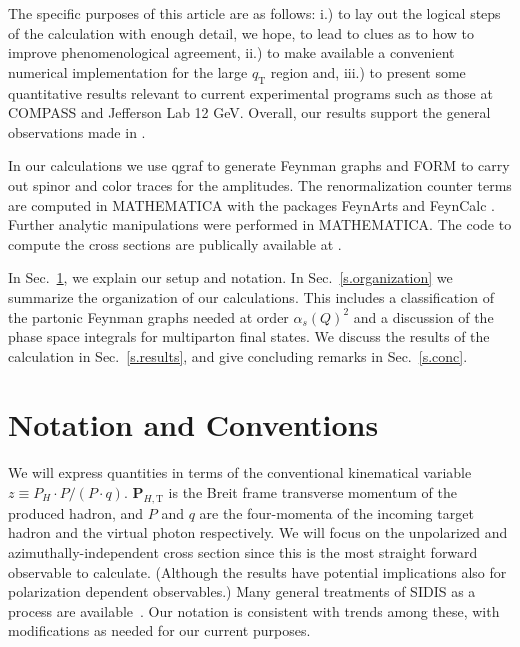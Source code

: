 \documentclass[prd,preprintnumbers,nofootinbib,superscriptaddress,onecolumn,preprint]{revtex4-1}
\newcommand{\T}[2]{\boldsymbol{#1}_{#2\text{T}}}
\newcommand\3[1]{\boldsymbol{#1}}
\newcommand{\Tsc}[2]{#1_{#2\text{T}}}
\newcommand{\sref}[1]{Sec.~\ref{s.#1}}
\begin{document}
The specific purposes of this article are as follows:  i.) to lay out
the logical steps of the calculation with enough detail, we hope, to
lead to clues as to how to improve phenomenological agreement,
ii.) to make available a convenient numerical implementation for the large $\Tsc{q}{}$ 
region and, 
iii.) to present some
quantitative results relevant to current
experimental programs such as those at COMPASS and Jefferson Lab 12 GeV.
Overall, our results support the general observations made in
\cite{Gonzalez-Hernandez:2018ipj}.

In our calculations we use qgraf \cite{Nogueira:1991ex}
to generate Feynman graphs and FORM \cite{Kuipers:2012rf}
to carry out spinor and color traces for the amplitudes. The renormalization
counter terms are computed in MATHEMATICA with the packages 
FeynArts \cite{Kublbeck:1990xc,Hahn:2000kx} and FeynCalc \cite{Mertig:1990an,Shtabovenko:2016sxi}.
Further analytic manipulations were performed in MATHEMATICA. 
The code to compute the cross sections are publically
available at \cite{BigTMD}.

In \sref{overview}, we explain our setup and notation. In \sref{organization} we 
summarize the organization of our calculations. This includes a classification of
the partonic Feynman graphs needed at order $\alpha_s(Q)^2$ and a discussion of the 
phase space integrals for multiparton final states. We discuss the results of the 
calculation in \sref{results}, and give concluding remarks in \sref{conc}.


\section{Notation and Conventions}
\label{s.overview}

We will express quantities in terms of the conventional kinematical
variable $z \equiv P_H \cdot P/ (P \cdot q)$. $\T{P}{H,}$ is the Breit
frame transverse momentum of the produced hadron, and $P$ and $q$ are
the four-momenta of the incoming target hadron and the virtual photon
respectively.  We will focus on the unpolarized and
azimuthally-independent cross section since this is the most straight
forward observable to calculate.  (Although the results have potential
implications also for polarization dependent observables.) Many 
general treatments of SIDIS as a process are available~\cite{Meng:1991da,Levelt:1993ac,Meng:1995yn,Mulders:1996dh,Nadolsky:1999kb,Nadolsky:2000ky,Barone:2001sp,Ji:2004xq,Bacchetta:2004jz,Koike:2006fn,Bacchetta:2006tn,Bacchetta:2008xw}. Our notation is consistent with trends among these, with modifications as needed for our current purposes.
\end{document}
